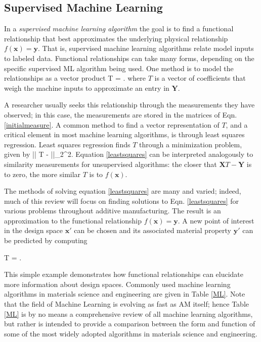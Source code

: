 \subsection{Supervised Machine Learning}
In a \textit{supervised machine learning algorithm} the goal is to find a functional relationship that best approximates the underlying physical relationship $f(\mathbf{x}) = \mathbf{y}$. That is, supervised machine learning algorithms relate model inputs to labeled data. Functional relationships can take many forms, depending on the specific supervised ML algorithm being used. One method is to model the relationships as a vector product 
\eqn
{}T = .
\label{map}
\equ
where $T$ is a vector of coefficients that weigh the machine inputs to approximate an entry in $\mathbf{Y}$. 

A researcher usually seeks this relationship through the measurements they have observed; in this case, the measurements are stored in the matrices of Eqn. \ref{initialmeasure}.
A common method to find a vector representation of $T$, and a critical element in most machine learning algorithms, is through least squares regression. Least squares regression finds $T$ through a minimization problem, given by
\eqn
\min || T -  ||_{2}^{2}.
\label{leastsquares}
\equ
Equation \ref{leastsquares} can be interpreted analogously to similarity measurements for unsupervised algorithms: the closer that $\mathbf{X}T - \mathbf{Y}$ is to zero, the more similar $T$ is to $f(\mathbf{x})$.

The methods of solving equation \ref{leastsquares} are many and varied; indeed, much of this review will focus on finding solutions to Eqn. \ref{leastsquares} for various problems throughout additive manufacturing.
The result is an approximation to the functional relationship $f(\mathbf{x}) = \mathbf{y}$.
A new point of interest in the design space $\mathbf{x'}$ can be chosen and its associated material property $\mathbf{y'}$ can be predicted by computing

\eqn
{}T = .
\equ

This simple example demonstrates how functional relationships can elucidate more information about design spaces.
Commonly used machine learning algorithms in materials science and engineering are given in Table \ref{ML}.
Note that the field of Machine Learning is evolving as fast as AM itself; hence Table \ref{ML} is by no means a comprehensive review of all machine learning algorithms, but rather is intended to provide a comparison between the form and function of some of the most widely adopted algorithms in materials science and engineering.

